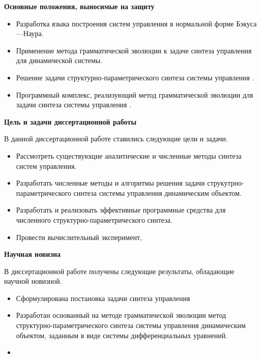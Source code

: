 
\textbf{Основные положения, выносимые на защиту}

    \begin{itemize}
        \item Разработка языка построения систем управления в нормальной форме Бэкуса---Наура.
        \item Применение метода грамматической эволюции к задаче синтеза управления для динамической системы.
        \item Решение задачи структурно-параметрического синтеза системы управления .
        \item Программный комплекс, реализующий метод грамматической эволюции для задачи синтеза системы управления .
    \end{itemize}

\textbf{Цель и задачи диссертационной работы}

В данной диссертационной работе ставились следующие цели и задачи.
    \begin{itemize}
        \item Рассмотреть существующие аналитические и численные методы синтеза систем управления.
        \item Разработать численные методы и алгоритмы решения задачи струкутрно-параметрического синтеза системы управления динамическим объектом.
        \item Разработать и реализовать эффективные программные средства для численного структурно-параметрического синтеза.
        \item Провести вычислительный эксперимент, 
    \end{itemize}

\textbf{Научная новизна}

В диссертационной работе получены следующие результаты, обладающие научной новизной.
    \begin{itemize}
        \item Сформулирована постановка задачи синтеза управления 
        \item Разработан основанный на методе грамматической эволюции метод структурно-параметрического синтеза системы управления динамическим объектом, заданным в виде системы дифференциальных уравнений. 
        \item 
    \end{itemize}

